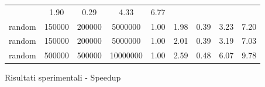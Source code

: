 \begin{figure*}[t]
{\begin{tabular}{lS[table-format=7.0] S[table-format=7.0] S[table-format=8.0] S[table-format=4.2] S[table-format=4.2] S[table-format=4.2] S[table-format=4.2] S[table-format=4.2]}
        & 1.90	
        & 0.29	
        & 4.33	
        & 6.77 \\
    random
        & 150000	
        & 200000	
        & 5000000	
        & 1.00	
        & 1.98	
        & 0.39	
        & 3.23	
        & 7.20 \\
    random
        & 150000	
        & 200000	
        & 5000000	
        & 1.00	
        & 2.01	
        & 0.39	
        & 3.19	
        & 7.03 \\
    random
        & 500000	
        & 500000	
        & 10000000	
        & 1.00	
        & 2.59	
        & 0.48	
        & 6.07	
        & 9.78 \\ \bottomrule
    \end{tabular}}
    \caption{Risultati sperimentali -  Speedup}
    \label{results_speedup}
\end{figure*}



